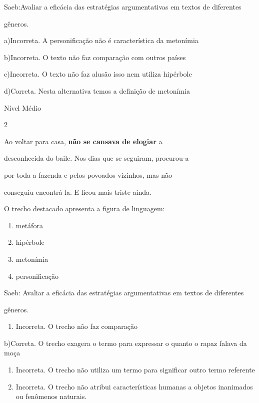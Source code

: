 {{Saeb:Avaliar a eficácia das estratégias argumentativas em textos de
diferentes

gêneros.

a)Incorreta. A personificação não é característica da metonímia

b)Incorreta. O texto não faz comparação com outros países

c)Incorreta. O texto não faz alusão isso nem utiliza hipérbole

d)Correta. Nesta alternativa temos a definição de metonímia

Nível Médio

\num{2}

Ao voltar para casa, \textbf{não se cansava de elogiar} a

desconhecida do baile. Nos dias que se seguiram, procurou-a

por toda a fazenda e pelos povoados vizinhos, mas não

conseguiu encontrá-la. E ficou mais triste ainda.

O trecho destacado apresenta a figura de linguagem:

\begin{enumerate}
\def\labelenumi{\alph{enumi})}
\item
  metáfora
\item
  hipérbole
\item
  metonímia
\item
  personificação
\end{enumerate}

Saeb: Avaliar a eficácia das estratégias argumentativas em textos de
diferentes

gêneros.

\begin{enumerate}
\def\labelenumi{\arabic{enumi}.}
\tightlist
\item
  Incorreta. O trecho não faz comparação
\end{enumerate}

b)Correta. O trecho exagera o termo para expressar o quanto o rapaz
falava da moça

\begin{enumerate}
\def\labelenumi{\arabic{enumi}.}
\item
  Incorreta. O trecho não utiliza um termo para significar outro termo
  referente
\item
  Incorreta. O trecho não atribui características humanas a objetos
  inanimados ou fenômenos naturais.
\end{enumerate}

}}
